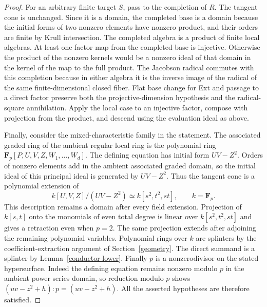 \begin{proof}
For an arbitrary finite target $S$, pass to the completion of $R$.
The tangent cone is unchanged.  Since it is a domain, the completed
base is a domain because the initial forms of two nonzero elements have
nonzero product, and their orders are finite by Krull intersection.
The completed algebra is a product of finite local algebras.
At least one factor map from the completed base is injective.
Otherwise the product of the nonzero kernels would be a nonzero
ideal of that domain in the kernel of the map to the full product.  The Jacobson radical commutes
with this completion because in either algebra it is the inverse image
of the radical of the same finite-dimensional closed fiber.
Flat base change for Ext and passage to a direct factor preserve
both the projective-dimension hypothesis and the radical-square
annihilation.  Apply the local case to an injective factor, compose
with projection from the product, and descend using the evaluation
ideal as above.

Finally, consider the mixed-characteristic family in the statement.
The associated graded ring of the ambient regular local ring is
the polynomial ring
$\mathbf F_p[P,U,V,Z,W_1,\ldots,W_d]$.
The defining equation has initial form $UV-Z^2$.  Orders of
nonzero elements add in the ambient associated graded domain,
so the initial ideal of this principal ideal is generated by
$UV-Z^2$.  Thus the tangent cone is a polynomial extension of
\[
 k[U,V,Z]/(UV-Z^2)\simeq k[s^2,t^2,st],
 \qquad k=\mathbf F_p.
\]
This description remains a domain after every field extension.
Projection of $k[s,t]$ onto the monomials of even total degree is
linear over $k[s^2,t^2,st]$ and gives a retraction even when
$p=2$.  The same projection extends after adjoining the remaining
polynomial variables.  Polynomial rings over $k$ are splinters by
the coefficient-extraction argument of Section~\ref{geometry}.
The direct summand is a splinter by Lemma~\ref{conductor-lower}.
Finally $p$ is a nonzerodivisor on the stated hypersurface.
Indeed the defining equation remains nonzero modulo $p$ in the
ambient power series domain, so reduction modulo $p$ shows
$(uv-z^2+h):p=(uv-z^2+h)$.
All the asserted hypotheses are therefore satisfied.
\end{proof}

